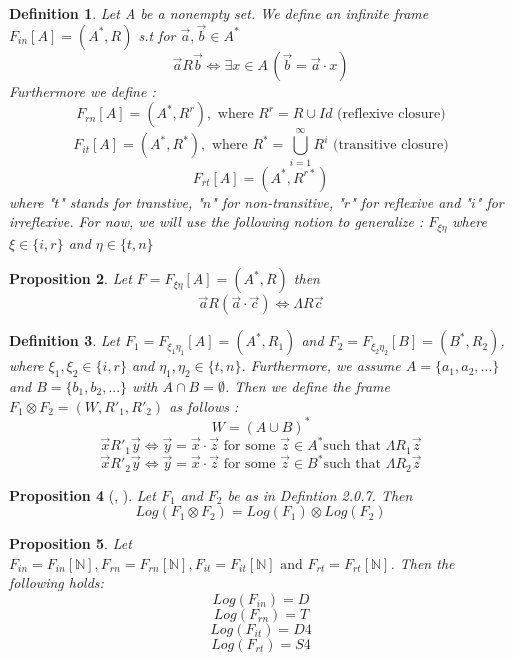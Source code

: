 \documentclass[12pt, a4paper]{scrartcl}
\newtheorem{definition}{Definition}[subsection]
\newtheorem{proposition}[definition]{Proposition}
\begin{document}
\begin{definition}
    Let A be a nonempty set. We define an infinite frame $F_{in}[A] = (A^*, R)$ s.t for $\vec{a}, \vec{b} \in A^*$ 
    $$\vec{a}R\vec{b} \Leftrightarrow \exists x \in A \, (\vec{b} = \vec{a} \cdot x)$$
    Furthermore we define : 
    $$F_{rn}[A] = (A^*,R^r), \mbox{ where } R^r = R \cup Id \mbox{ (reflexive closure)}$$
    $$F_{it}[A] = (A^*,R^*), \mbox{ where } R^* = \bigcup_{i=1}^{\infty}R^i \mbox{ (transitive closure)}$$
    $$F_{rt}[A] = (A^*, R^{r*})$$ \newline
    where "$t$" stands for transtive, "$n$" for non-transitive, "$r$" for reflexive and "$i$" for irreflexive. \newline
    For now, we will use the following notion to generalize : $F_{\xi \eta}$ where $\xi \in \{i,r\}$ and $\eta \in \{t,n\}$ \newline
\end{definition}

\begin{proposition}
    Let $F =F_{\xi \eta}[A] = (A^*, R)$ then $$\vec{a}R(\vec{a} \cdot \vec{c}) \Leftrightarrow \Lambda R \vec{c}$$ 
\end{proposition}

\begin{definition}
    Let $F_1 = F_{\xi_1 \eta_1}[A] = (A^*,R_1)$ and $F_2 = F_{\xi_2 \eta_2}[B] = (B^*,R_2)$, where $\xi_1, \xi_2 \in \{i,r\}$ 
    and $\eta_1, \eta_2 \in \{t,n\}$. Furthermore, we assume $A = \{a_1, a_2,...\}$ and $B = \{b_1,b_2,...\}$ with $A \cap B = \emptyset$. Then we define the frame $F_1 \otimes F_2 = (W, R'_1, R'_2)$ as follows :
    $$W = (A \cup B)^*$$
    $$\vec{x} R'_1 \vec{y} \Leftrightarrow \vec{y} = \vec{x} \cdot \vec{z} \mbox{ for some } \vec{z} \in A^* \mbox{such that }\Lambda R_1 \vec{z}$$
    $$\vec{x} R'_2 \vec{y} \Leftrightarrow \vec{y} = \vec{x} \cdot \vec{z} \mbox{ for some } \vec{z} \in B^* \mbox{such that }\Lambda R_2 \vec{z}$$ \newline
\end{definition}

\begin{proposition} [\cite{ref6}, \cite{ref4}]
    Let $F_1$ and $F_2$ be as in Defintion 2.0.7. Then 
    $$Log(F_1 \otimes F_2) = Log(F_1) \otimes Log(F_2)$$
\end{proposition}

\begin{proposition}
    Let $F_{in} = F_{in}[\mathbb{N}], F_{rn} = F_{rn}[\mathbb{N}], F_{it} = F_{it}[\mathbb{N}] \mbox{ and } F_{rt} = F_{rt}[\mathbb{N}]$. Then the following holds: \newline 
    $$ Log(F_{in}) = D$$
    $$ Log(F_{rn}) = T$$
    $$ Log(F_{it}) = D4$$
    $$ Log(F_{rt}) = S4$$

\end{proposition}
\end{document}
